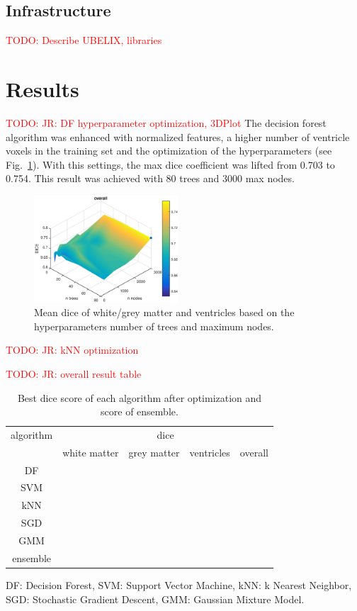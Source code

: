 \documentclass[journal]{IEEEtran}
\newcommand\TODO[1]{\textcolor{red}{TODO: #1}}
\begin{document}
\subsection{Infrastructure}
\TODO{Describe UBELIX, libraries}


\section{Results}

\TODO{JR: DF hyperparameter optimization, 3DPlot}
The decision forest algorithm was enhanced with normalized features, a higher number of ventricle voxels in the training set and the optimization of the hyperparameters (see Fig.~\ref{f.df_white}). With this settings, the max dice coefficient was lifted from 0.703 to 0.754. This result was achieved with 80 trees and 3000 max nodes.

\begin{figure}[h!]\label{f.df_white}
	\centering
	\includegraphics[width=0.48\textwidth]{images/DF_crossval}
	\caption{Mean dice of white/grey matter and ventricles based on the hyperparameters number of trees and maximum nodes.}
\end{figure}

\TODO{JR: kNN optimization}


\TODO{JR: overall result table}\\


\begin{table}[h!]
	\begin{center}
		\label{tab.dice}
		\caption{Best dice score of each algorithm after optimization and score of ensemble.}
		\begin{tabular}{c|ccc|c}
			algorithm &             \multicolumn{4}{c}{dice}              \\ \cline{2-5}
			          & white matter & grey matter & ventricles & overall \\
			   DF     &              &             &            &  \\
			   SVM    &              &             &            &  \\
			   kNN    &              &             &            &  \\
			   SGD    &              &             &            &  \\
			   GMM    &              &             &            &  \\
			ensemble  &              &             &            &
		\end{tabular}
	\end{center}
DF: Decision Forest, SVM: Support Vector Machine, kNN: k Nearest Neighbor, SGD: Stochastic Gradient Descent, GMM: Gaussian Mixture Model.
\end{table} 
\end{document}

